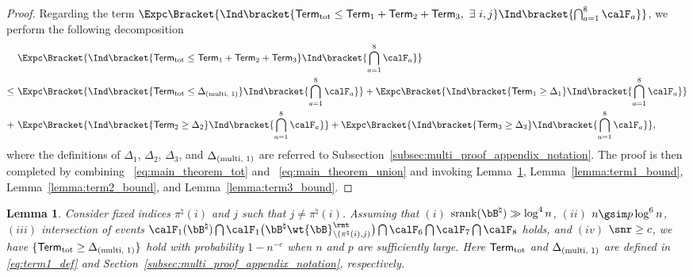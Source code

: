\documentclass[11pt]{article}
\newtheorem{lemma}{Lemma}
\def \bBtrue {\bB^{\natural}}
\def \term {\mathsf{Term}}
\def\srank#1{\textup{srank}(#1)}
\def\wtminus#1#2{\wt{#1}_{\setminus (#2)}}
\begin{document}
\begin{proof}
Regarding the term $\Expc\Bracket{\Ind\bracket{\term_{\textup{tot}} \leq \term_{1} + \term_{2} + \term_{3},~\exists~i, j}\Ind\bracket{\bigcap_{a=1}^8 \calF_a}}$, we perform the following decomposition
\begin{align}
\label{eq:main_theorem_union}	
& \Expc\Bracket{\Ind\bracket{\term_{\textup{tot}} \leq \term_{1} + \term_{2} + \term_{3}}\Ind\bracket{\bigcap_{a=1}^8 \calF_a}} \notag \\
\leq~& \Expc\Bracket{\Ind\bracket{\term_{\textup{tot}} \leq \Delta_{(\textup{multi, 1})}}\Ind\bracket{\bigcap_{a=1}^8 \calF_a}} + \Expc\Bracket{\Ind\bracket{\term_{1} \geq \Delta_1}\Ind\bracket{\bigcap_{a=1}^8 \calF_a}}\notag  \\
+~&
\Expc\Bracket{\Ind\bracket{\term_{2} \geq \Delta_2}\Ind\bracket{\bigcap_{a=1}^8 \calF_a}} +
\Expc\Bracket{\Ind\bracket{\term_{3} \geq \Delta_3}\Ind\bracket{\bigcap_{a=1}^8 \calF_a}},
\end{align}
where the definitions of
$\Delta_1$, $\Delta_2$, $\Delta_3$, and $\Delta_{(\textup{multi, 1})}$ are referred to
Subsection~\ref{subsec:multi_proof_appendix_notation}.
The proof is then completed by
combining ~\eqref{eq:main_theorem_tot} and ~\eqref{eq:main_theorem_union}
and invoking
Lemma~\ref{lemma:termtot_bound}, Lemma~\ref{lemma:term1_bound},
Lemma~\ref{lemma:term2_bound}, and Lemma~\ref{lemma:term3_bound}.

\end{proof}

\begin{lemma}
\label{lemma:termtot_bound}
Consider fixed indices $\pi^{\natural}(i)$ and $j$ such that $j\neq \pi^{\natural}(i)$.
Assuming that $(i)$ $\srank{\bBtrue}\gg \log^4 n$,
$(ii)$ $n\gsim p \log^6 n$, $(iii)$
intersection of events
$\calF_1(\bBtrue)\bigcap { \calF_1\big(\bBtrue \wtminus{\bB}{\pi^{\natural}(i), j}^{\rmt} \big) }\bigcap \calF_6 \bigcap \calF_7 \bigcap \calF_8$ holds, and $(iv)$ $\snr \geq c$,
 we have $\{\term_{\textup{tot}} \geq \Delta_{(\textup{multi, 1})}\}$
hold with probability
$1 - n^{-c}$ when $n$ and $p$ are sufficiently large.
Here $\term_{\textup{tot}}$ and $\Delta_{(\textup{multi, 1})}$ are defined in
\eqref{eq:term1_def} and Section~\ref{subsec:multi_proof_appendix_notation}, respectively.
\end{lemma}
\end{document}

